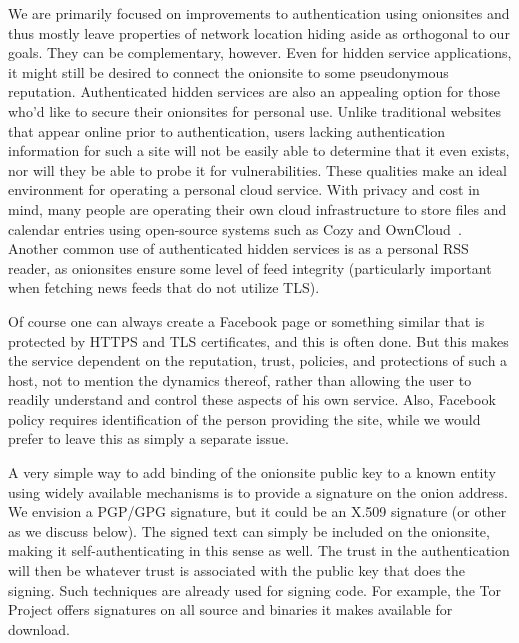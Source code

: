 \documentclass[10pt, conference, compsocconf]{styles/IEEEtran}
\begin{document}
We are primarily focused on improvements to authentication using
onionsites and thus mostly leave properties of network location hiding
aside as orthogonal to our goals. They can be complementary, however.
Even for hidden service applications, it might still be desired to
connect the onionsite to some pseudonymous reputation.  Authenticated
hidden services are also an appealing option for those who'd like to
secure their onionsites for personal use.  Unlike traditional websites
that appear online prior to authentication, users lacking
authentication information for such a site will not be easily able to
determine that it even exists, nor will they be able to probe it for
vulnerabilities.  These qualities make an ideal environment for
operating a personal cloud service.  With privacy and cost in mind,
many people are operating their own cloud infrastructure to store
files and calendar entries using open-source systems such as Cozy and
OwnCloud~\cite{cozy}.  Another common use of authenticated hidden
services is as a personal RSS reader, as onionsites ensure some level
of feed integrity (particularly important when fetching news feeds
that do not utilize TLS).

Of course one can always create a Facebook page or something similar
that is protected by HTTPS and TLS certificates,
and this is often done.  But this makes the service dependent on the
reputation, trust, policies, and protections of such a host, not to mention
the dynamics thereof, rather than allowing the user to readily understand
and control these aspects of his own service. Also, Facebook
policy requires identification of the person providing the site,
while we would prefer to leave this as simply a separate issue.

A very simple way to add binding of the onionsite public key to
a known entity using widely available mechanisms is to provide a
signature on the onion address. We envision a PGP/GPG signature, but
it could be an X.509 signature (or other as we discuss below). 
The signed text can simply be
included on the onionsite, making it self-authenticating in this sense
as well. The trust in the authentication will then be whatever trust
is associated with the public key that does the signing. Such
techniques are already used for signing code. For example,
the Tor Project offers signatures on all source and binaries
it makes available for download. 
\end{document}
